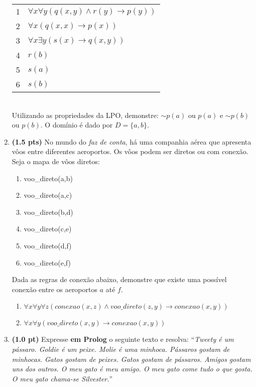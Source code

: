 \documentclass[11pt, a4paper,final]{article}
\begin{document}
\begin{enumerate}
\begin{tabular}{ll}
1 &  $\forall x\forall y (q(x,y) \wedge r(y) \rightarrow p(y)) $ \\
2 &  $\forall x  (q(x,x) \rightarrow p(x))  $ \\
3 &  $\forall x \exists y ( s(x) \rightarrow q(x,y)) $ \\
4 &  $r(b)$ \\ 
5 &  $s(a)$ \\
6 &  $s(b)$ \\
\end{tabular}\\
Utilizando as propriedades da LPO, demonstre: $\sim p(a)$ ou $p(a)$ e $\sim p(b)$ ou $p(b)$.
O domínio é dado por $D=\{a,b\}$. 


\item {\bf (1.5 pts)} No mundo do {\em faz de conta}, há uma
companhia aérea que apresenta vôos entre diferentes
aeroportos. Os vôos podem ser diretos ou com conexão.
Seja o mapa de vôos diretos:
\begin{enumerate}
\setlength{\itemsep}{-2pt}
    \item voo\_direto(a,b)
    \item voo\_direto(a,c)
    \item voo\_direto(b,d)
    \item voo\_direto(c,e)
    \item voo\_direto(d,f)
    \item voo\_direto(e,f)
\end{enumerate}
Dada as regras de conexão abaixo, demonstre  que existe uma possível
conexão  entre os aeroportos  $a$ até $f$.
\begin{enumerate}
\setlength{\itemsep}{-2pt}
  \item  $\forall x \forall y \forall z ( conexao(x,z) \wedge voo\_direto(z,y) \rightarrow  conexao(x,y) )$
\item $\forall x \forall y (voo\_direto(x,y)  \rightarrow  conexao(x,y) )$
\end{enumerate}


\item {\bf (1.0 pt)} Expresse {\bf em Prolog} o seguinte texto e resolva: 
``\textit{Tweety é um pássaro. Goldie é um peixe. Molie é uma minhoca. Pássaros gostam de minhocas. Gatos gostam de peixes. Gatos gostam de pássaros. Amigos gostam uns dos outros. O meu gato é meu amigo. O meu gato come tudo o que gosta. O meu gato chama-se Silvester.}''


\end{enumerate}
\end{document}
